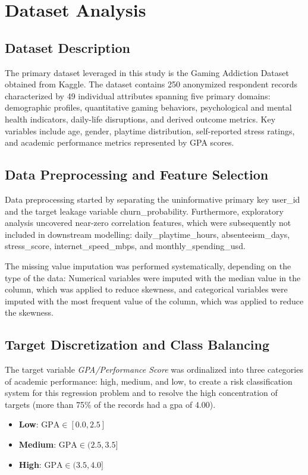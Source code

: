 \documentclass[conference]{IEEEtran}
\begin{document}
\section{Dataset Analysis}

\subsection{Dataset Description}
The primary dataset leveraged in this study is the Gaming Addiction Dataset obtained from Kaggle. The dataset contains 250 anonymized respondent records characterized by 49 individual attributes spanning five primary domains: demographic profiles, quantitative gaming behaviors, psychological and mental health indicators, daily-life disruptions, and derived outcome metrics. Key variables include age, gender, playtime distribution, self-reported stress ratings, and academic performance metrics represented by GPA scores.

\subsection{Data Preprocessing and Feature Selection}
Data preprocessing started by separating the uninformative primary key user\_id and the target leakage variable churn\_probability. Furthermore, exploratory analysis uncovered near-zero correlation features, which were subsequently not included in downstream modelling: daily\_playtime\_hours, absenteeism\_days, stress\_score, internet\_speed\_mbps, and monthly\_spending\_usd.

The missing value imputation was performed systematically, depending on the type of the data: Numerical variables were imputed with the median value in the column, which was applied to reduce skewness, and categorical variables were imputed with the most frequent value of the column, which was applied to reduce the skewness.



\subsection{Target Discretization and Class Balancing}
The target variable \textit{GPA/Performance Score} was ordinalized into three categories of academic performance: high, medium, and low, to create a risk classification system for this regression problem and to resolve the high concentration of targets (more than 75\% of the records had a gpa of 4.00).
\begin{itemize}
    \item \textbf{Low}: $\text{GPA} \in [0.0, 2.5]$
    \item \textbf{Medium}: $\text{GPA} \in (2.5, 3.5]$
    \item \textbf{High}: $\text{GPA} \in (3.5, 4.0]$
\end{itemize}
\end{document}
